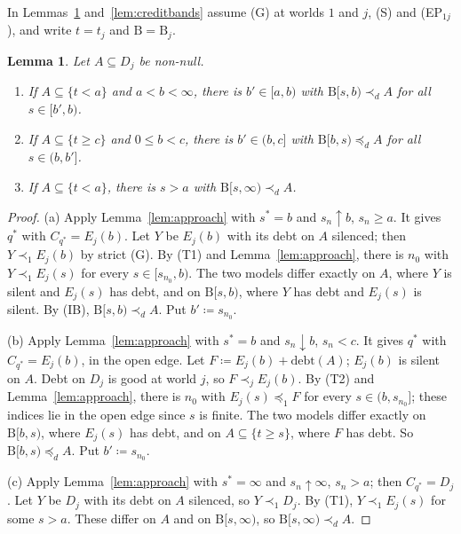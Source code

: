 \documentclass[11pt]{article}
\newtheorem{lemma}[theorem]{Lemma}
\theoremstyle{definition}\newtheorem{definition}[theorem]{Definition}
\theoremstyle{remark}\newtheorem{remark}[theorem]{Remark}
\newcommand{\debt}{\mathrm{debt}}
\newcommand{\Band}{\mathrm{B}}
\begin{document}
In Lemmas~\ref{lem:debtbands} and~\ref{lem:creditbands} assume (G) at
worlds $1$ and $j$, (S) and (EP$_{1j}$), and write $t=t_j$ and
$\Band=\Band_j$.

\begin{lemma}\label{lem:debtbands}
Let $A\subseteq D_j$ be non-null.
\begin{enumerate}[label=(\alph*)]
\item If $A\subseteq\{t<a\}$ and $a<b<\infty$, there is $b'\in[a,b)$ with
$\Band[s,b)\prec_dA$ for all $s\in[b',b)$.
\item If $A\subseteq\{t\ge c\}$ and $0\le b<c$, there is $b'\in(b,c]$ with
$\Band[b,s)\preceq_dA$ for all $s\in(b,b']$.
\item If $A\subseteq\{t<a\}$, there is $s>a$ with $\Band[s,\infty)\prec_dA$.
\end{enumerate}
\end{lemma}
\begin{proof}
(a) Apply Lemma~\ref{lem:approach} with $s^*=b$ and $s_n\uparrow b$,
$s_n\ge a$. It gives $q^*$ with $C_{q^*}=E_j(b)$. Let $Y$ be $E_j(b)$ with
its debt on $A$ silenced; then $Y\prec_1E_j(b)$ by strict (G). By (T1) and
Lemma~\ref{lem:approach}, there is $n_0$ with $Y\prec_1E_j(s)$ for every
$s\in[s_{n_0},b)$. The two models differ exactly on $A$, where $Y$ is silent
and $E_j(s)$ has debt, and on $\Band[s,b)$, where $Y$ has debt and $E_j(s)$
is silent. By (IB), $\Band[s,b)\prec_dA$. Put $b'\coloneqq s_{n_0}$.

(b) Apply Lemma~\ref{lem:approach} with $s^*=b$ and $s_n\downarrow b$,
$s_n<c$. It gives $q^*$ with $C_{q^*}=E_j(b)$, in the open edge. Let
$F\coloneqq E_j(b)+\debt(A)$; $E_j(b)$ is silent on $A$. Debt on $D_j$ is
good at world $j$, so $F\prec_jE_j(b)$. By (T2) and
Lemma~\ref{lem:approach}, there is $n_0$ with $E_j(s)\preceq_1F$ for every
$s\in(b,s_{n_0}]$; these indices lie in the open edge since $s$ is finite.
The two models differ exactly on $\Band[b,s)$, where $E_j(s)$ has debt, and
on $A\subseteq\{t\ge s\}$, where $F$ has debt. So $\Band[b,s)\preceq_dA$. Put
$b'\coloneqq s_{n_0}$.

(c) Apply Lemma~\ref{lem:approach} with $s^*=\infty$ and $s_n\uparrow\infty$,
$s_n>a$; then $C_{q^*}=D_j$. Let $Y$ be $D_j$ with its debt on $A$ silenced,
so $Y\prec_1D_j$. By (T1), $Y\prec_1E_j(s)$ for some $s>a$. These differ on
$A$ and on $\Band[s,\infty)$, so $\Band[s,\infty)\prec_dA$.
\end{proof}
\end{document}
